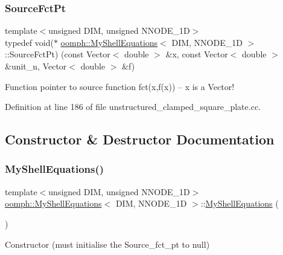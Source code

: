 \subsubsection{\texorpdfstring{Source\+Fct\+Pt}{SourceFctPt}}
{\footnotesize\ttfamily template$<$unsigned D\+IM, unsigned N\+N\+O\+D\+E\+\_\+1D$>$ \\
typedef void($\ast$ \hyperlink{classoomph_1_1MyShellEquations}{oomph\+::\+My\+Shell\+Equations}$<$ D\+IM, N\+N\+O\+D\+E\+\_\+1D $>$\+::Source\+Fct\+Pt) (const Vector$<$ double $>$ \&x, const Vector$<$ double $>$ \&unit\+\_\+n, Vector$<$ double $>$ \&f)}



Function pointer to source function fct(x,f(x)) -- x is a Vector! 



Definition at line 186 of file unstructured\+\_\+clamped\+\_\+square\+\_\+plate.\+cc.



\subsection{Constructor \& Destructor Documentation}
\mbox{\label{classoomph_1_1MyShellEquations_a4d459716fb0b2b66ece7d87c0feac9ed}} 
\subsubsection{\texorpdfstring{My\+Shell\+Equations()}{MyShellEquations()}\hspace{0.1cm}{\footnotesize\ttfamily [1/2]}}
{\footnotesize\ttfamily template$<$unsigned D\+IM, unsigned N\+N\+O\+D\+E\+\_\+1D$>$ \\
\hyperlink{classoomph_1_1MyShellEquations}{oomph\+::\+My\+Shell\+Equations}$<$ D\+IM, N\+N\+O\+D\+E\+\_\+1D $>$\+::\hyperlink{classoomph_1_1MyShellEquations}{My\+Shell\+Equations} (\begin{DoxyParamCaption}{ }\end{DoxyParamCaption})\hspace{0.3cm}{\ttfamily [inline]}}



Constructor (must initialise the Source\+\_\+fct\+\_\+pt to null) 



